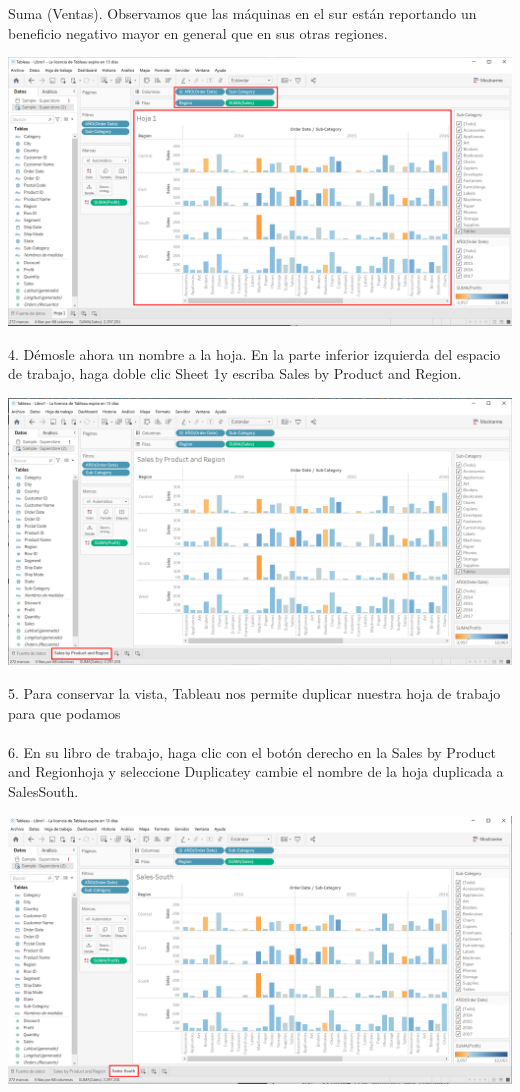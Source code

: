 \documentclass[12pt,letterpaper]{article}
\begin{document}
Suma (Ventas). Observamos que las máquinas en el sur están reportando un beneficio negativo
mayor en general que en sus otras regiones.
\begin{center}
    \includegraphics[width=16cm]{img/16.png}  
\end{center}
4. Démosle ahora un nombre a la hoja. En la parte inferior izquierda del espacio de trabajo, haga
doble clic Sheet 1y escriba Sales by Product and Region.
\begin{center}
    \includegraphics[width=16cm]{img/17.png}  
\end{center}
5. Para conservar la vista, Tableau nos permite duplicar nuestra hoja de trabajo para que podamos
\\\\6. En su libro de trabajo, haga clic con el botón derecho en la Sales by Product and
Regionhoja y seleccione Duplicatey cambie el nombre de la hoja duplicada a SalesSouth.
\begin{center}
    \includegraphics[width=16cm]{img/18.png}  
\end{center}
\end{document}
